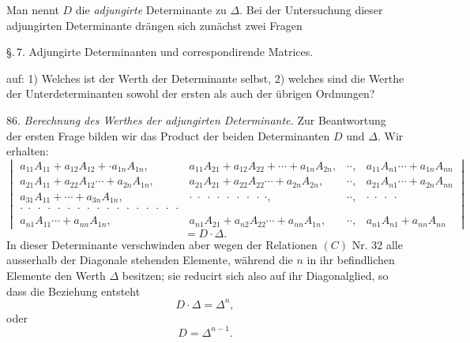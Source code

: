 \documentclass[11pt]{article}
\providecommand{\weberpage}[1]{}
\providecommand{\weq}[2]{\begin{equation}\tag{#1}#2\end{equation}}
\let\Delta\varDelta
\begin{document}
Man nennt $D$ die \textit{adjungirte} Determinante zu $\Delta$. Bei der Untersuchung dieser adjungirten Determinante drängen sich zunächst zwei Fragen


\weberpage{89}
\S.\,7. Adjungirte Determinanten und correspondirende Matrices.

auf: 1) Welches ist der Werth der Determinante selbst, 2) welches sind die Werthe der Unterdeterminanten sowohl der ersten als auch der übrigen Ordnungen?

86. \textit{Berechnung des Werthes der adjungirten Determinante.} Zur Beantwortung der ersten Frage bilden wir das Product der beiden Determinanten $D$ und $\Delta$. Wir erhalten:
\[
\begin{vmatrix}
a_{11}A_{11}+a_{12}A_{12}+\cdot a_{1n}A_{1n}, & a_{11}A_{21}+a_{12}A_{22}+\cdots+a_{1n}A_{2n}, & \cdot\cdot, & a_{11}A_{n1}\cdots+a_{1n}A_{nn} \\
a_{21}A_{11}+a_{22}A_{12}\cdots+a_{2n}A_{1n}, & a_{21}A_{21}+a_{22}A_{22}\cdots+a_{2n}A_{2n}, & \cdot\cdot, & a_{21}A_{n1}\cdots+a_{2n}A_{nn} \\
a_{31}A_{11}+\cdots+a_{3n}A_{1n}, & \cdot\;\cdot\;\cdot\;\cdot\;\cdot\;\cdot\;\cdot\;\cdot\;\cdot, & \cdot\cdot, & \cdot\;\cdot\;\cdot\;\cdot \\
\cdot\;\cdot\;\cdot\;\cdot\;\cdot\;\cdot\;\cdot\;\cdot\;\cdot\;\cdot\;\cdot\;\cdot\;\cdot\;\cdot\;\cdot\;\cdot\;\cdot & & & \\
a_{n1}A_{11}\cdots+a_{nn}A_{1n}, & a_{n1}A_{21}+a_{n2}A_{22}\cdots+a_{nn}A_{1n}, & \cdot\cdot, & a_{n1}A_{n1}+a_{nn}A_{nn}
\end{vmatrix}
\]
\[
= D\cdot\Delta.
\]
In dieser Determinante verschwinden aber wegen der Relationen $(C)$ Nr. 32 alle ausserhalb der Diagonale stehenden Elemente, während die $n$ in ihr befindlichen Elemente den Werth $\Delta$ besitzen; sie reducirt sich also auf ihr Diagonalglied, so dass die Beziehung entsteht
\weq{1}{D\cdot\Delta=\Delta^n,}
oder
\[
D=\Delta^{n-1}.
\]
\end{document}
